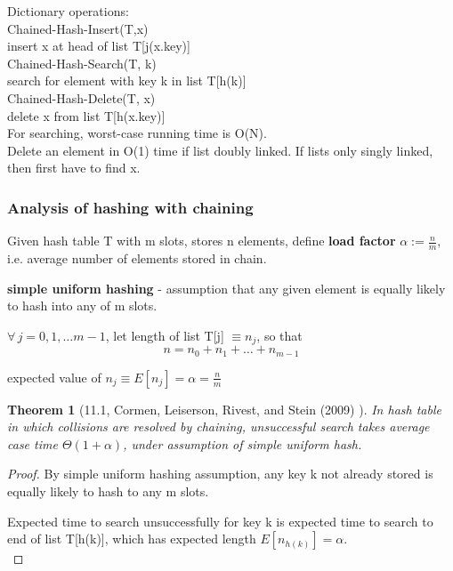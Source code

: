 \documentclass[10pt]{amsart}
\newtheorem{theorem}{Theorem}
\begin{document}
\begin{multicols*}{2}
Dictionary operations: \\
Chained-Hash-Insert(T,x) \\
\quad insert x at head of list T[j(x.key)] \\

Chained-Hash-Search(T, k) \\
\quad search for element with key k in list T[h(k)] \\

Chained-Hash-Delete(T, x) \\
\quad delete x from list T[h(x.key)] \\

 
For searching, worst-case running time is O(N). \\
Delete an element in O(1) time if list doubly linked. If lists only singly linked, then first have to find x.
 
\subsubsection{Analysis of hashing with chaining}
 
Given hash table T with m slots, stores n elements, define \textbf{load factor} $\alpha := \frac{n}{m}$, i.e. average number of elements stored in chain.

\textbf{simple uniform hashing} - assumption that any given element is equally likely to hash into any of m slots.

$\forall \, j = 0, 1, \dots m - 1$, let length of list T[j] $\equiv n_j$, so that \\
\[
n = n_0 + n_1 + \dots + n_{m-1}
\] 

expected value of $n_j \equiv E[n_j] = \alpha = \frac{n}{m}$ \\

\begin{theorem}[11.1, Cormen, Leiserson, Rivest, and Stein (2009) \cite{CLRS2009}]
In hash table in which collisions are resolved by chaining, unsuccessful search takes average case time $\Theta(1+\alpha)$, under assumption of simple uniform hash.
\end{theorem}

\begin{proof}

By simple uniform hashing assumption, any key k not already stored is equally likely to hash to any m slots.

Expected time to search unsuccessfully for key k is expected time to search to end of list T[h(k)], which has expected length $E[n_{h(k)}] = \alpha$. \\


\end{proof}
\end{multicols*}
\end{document}
